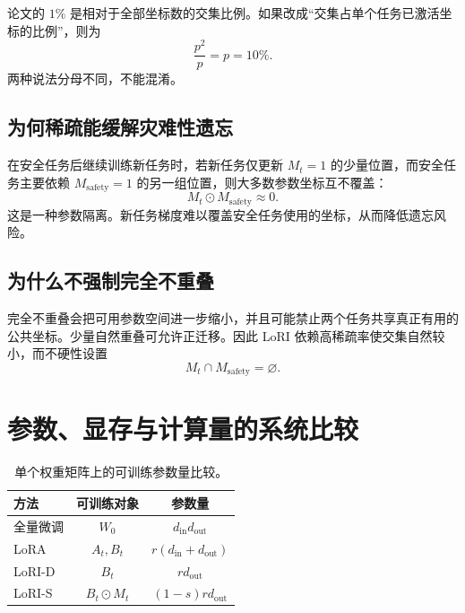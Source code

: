 \documentclass[UTF8,12pt,a4paper,fontset=none]{ctexart}
\numberwithin{equation}{section}
\begin{document}
\begin{notebox}[“1\% 重叠”有两种分母]
论文的 $1\%$ 是相对于全部坐标数的交集比例。如果改成“交集占单个任务已激活坐标的比例”，则为
\begin{equation*}
  \frac{p^2}{p}=p=10\%.
\end{equation*}
两种说法分母不同，不能混淆。
\end{notebox}

\subsection{为何稀疏能缓解灾难性遗忘}

在安全任务后继续训练新任务时，若新任务仅更新 $M_t=1$ 的少量位置，而安全任务主要依赖 $M_{\mathrm{safety}}=1$ 的另一组位置，则大多数参数坐标互不覆盖：
\begin{equation}
  M_t\odot M_{\mathrm{safety}}\approx0.
\end{equation}
这是一种参数隔离。新任务梯度难以覆盖安全任务使用的坐标，从而降低遗忘风险。

\subsection{为什么不强制完全不重叠}

完全不重叠会把可用参数空间进一步缩小，并且可能禁止两个任务共享真正有用的公共坐标。少量自然重叠可允许正迁移。因此 LoRI 依赖高稀疏率使交集自然较小，而不硬性设置
\begin{equation}
  M_t\cap M_{\mathrm{safety}}=\varnothing.
\end{equation}

\section{参数、显存与计算量的系统比较}

\begin{table}[H]
\centering
\caption{单个权重矩阵上的可训练参数量比较。}
\begin{tabular}{lcc}
\toprule
方法 & 可训练对象 & 参数量\\
\midrule
全量微调 & $W_0$ & $d_{\mathrm{in}}d_{\mathrm{out}}$\\
LoRA & $A_t,B_t$ & $r(d_{\mathrm{in}}+d_{\mathrm{out}})$\\
LoRI-D & $B_t$ & $rd_{\mathrm{out}}$\\
LoRI-S & $B_t\odot M_t$ & $(1-s)rd_{\mathrm{out}}$\\
\bottomrule
\end{tabular}
\end{table}
\end{document}
